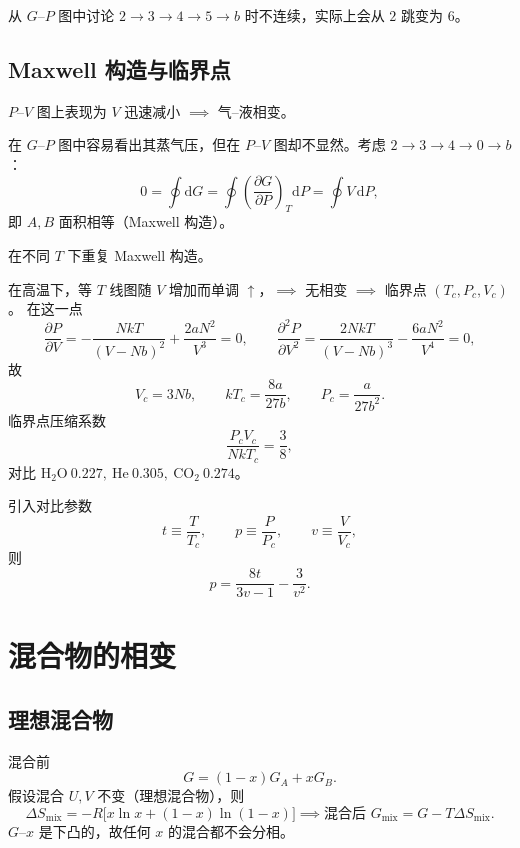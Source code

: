 从 $G$--$P$ 图中讨论 $2\to3\to4\to5\to b$ 时不连续，实际上会从 $2$ 跳变为 $6$。

\subsection{Maxwell 构造与临界点}
$P$--$V$ 图上表现为 $V$ 迅速减小 $\implies$ 气--液相变。

在 $G$--$P$ 图中容易看出其蒸气压，但在 $P$--$V$ 图却不显然。考虑 $2\to3\to4\to0\to b$：
\begin{equation}
    0=\oint \mathrm{d}G
    =\oint\left(\frac{\partial G}{\partial P}\right)_T\mathrm{d}P
    =\oint V\,\mathrm{d}P,
\end{equation}
即 $A,B$ 面积相等（Maxwell 构造）。

在不同 $T$ 下重复 Maxwell 构造。

在高温下，等 $T$ 线图随 $V$ 增加而单调 $\uparrow$，$\implies$ 无相变 $\implies$ 临界点 $(T_c,P_c,V_c)$。
在这一点
\begin{equation}
    \frac{\partial P}{\partial V}
    =-\frac{NkT}{(V-Nb)^2}+\frac{2aN^2}{V^3}=0,\qquad
    \frac{\partial^2 P}{\partial V^2}
    =\frac{2NkT}{(V-Nb)^3}-\frac{6aN^2}{V^4}=0,
\end{equation}
故
\begin{equation}
    V_c=3Nb,\qquad kT_c=\frac{8a}{27b},\qquad P_c=\frac{a}{27b^2}.
\end{equation}
临界点压缩系数
\begin{equation}
    \frac{P_cV_c}{NkT_c}=\frac{3}{8},
\end{equation}
对比 $\mathrm{H_2O}\ 0.227,\ \mathrm{He}\ 0.305,\ \mathrm{CO_2}\ 0.274$。

引入对比参数
\begin{equation}
    t\equiv \frac{T}{T_c},\qquad p\equiv \frac{P}{P_c},\qquad v\equiv \frac{V}{V_c},
\end{equation}
则
\begin{equation}
    p=\frac{8t}{3v-1}-\frac{3}{v^2}.
\end{equation}

\section{混合物的相变}
\subsection{理想混合物}
混合前
\begin{equation}
    G=(1-x)G_A+xG_B.
\end{equation}
假设混合 $U,V$ 不变（理想混合物），则
\begin{equation}
    \Delta S_{\mathrm{mix}}=-R\bigl[x\ln x+(1-x)\ln(1-x)\bigr]
    \implies \text{混合后 }G_{\mathrm{mix}}=G-T\Delta S_{\mathrm{mix}}.
\end{equation}
$G$--$x$ 是下凸的，故任何 $x$ 的混合都不会分相。

